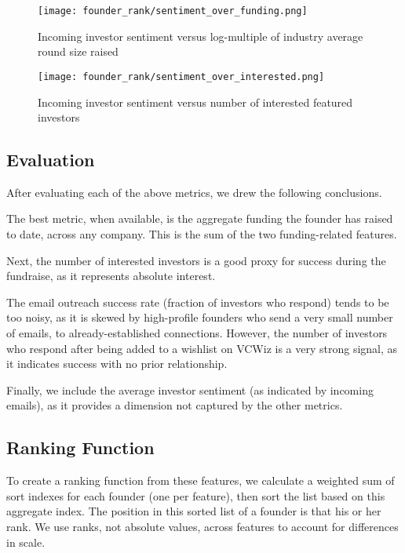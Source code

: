 \begin{figure}[H]
  \centering
  \begin{minipage}[t]{0.48\textwidth}
    \centering
    \texttt{[image: founder\_rank/sentiment\_over\_funding.png]}
    \caption{Incoming investor sentiment versus log-multiple of industry average round size raised}
    \label{fig:sentiment:raised}
  \end{minipage}\hfill
  \begin{minipage}[t]{0.48\textwidth}
    \centering
    \texttt{[image: founder\_rank/sentiment\_over\_interested.png]}
    \caption{Incoming investor sentiment versus number of interested featured investors}
    \label{fig:sentiment:interested}
  \end{minipage}
\end{figure}

\subsection{Evaluation}

After evaluating each of the above metrics, we drew the following conclusions.

The best metric, when available, is the aggregate funding the founder has raised to date, across any company. This is the sum of the two funding-related features.

Next, the number of interested investors is a good proxy for success during the fundraise, as it represents absolute interest.

The email outreach success rate (fraction of investors who respond) tends to be too noisy, as it is skewed by high-profile founders who send a very small number of emails, to already-established connections. However, the number of investors who respond after being added to a wishlist on VCWiz is a very strong signal, as it indicates success with no prior relationship.

Finally, we include the average investor sentiment (as indicated by incoming emails), as it provides a dimension not captured by the other metrics.

\subsection{Ranking Function}

To create a ranking function from these features, we calculate a weighted sum of sort indexes for each founder (one per feature), then sort the list based on this aggregate index. The position in this sorted list of a founder is that his or her rank. We use ranks, not absolute values, across features to account for differences in scale.

